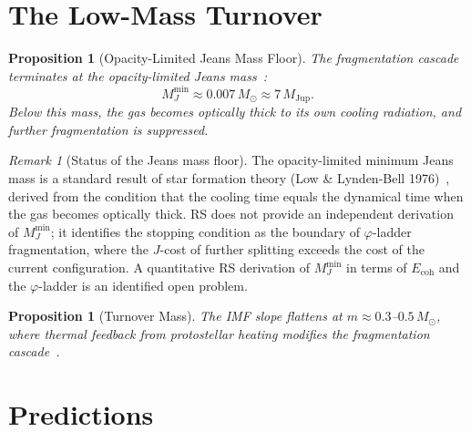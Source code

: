 \documentclass[12pt,a4paper]{article}
\newtheorem{proposition}[theorem]{Proposition}
\theoremstyle{definition}
\theoremstyle{remark}
\newtheorem{remark}[theorem]{Remark}
\begin{document}
\section{The Low-Mass Turnover}
\label{sec:turnover}

\begin{proposition}[Opacity-Limited Jeans Mass Floor]
\label{thm:jeans}
The fragmentation cascade terminates at the opacity-limited Jeans
mass~\cite{Low1976}:
\begin{equation}
  M_J^{\mathrm{min}} \approx 0.007\,M_\odot
  \approx 7\,M_{\mathrm{Jup}}.
\end{equation}
Below this mass, the gas becomes optically thick to its own cooling
radiation, and further fragmentation is suppressed.
\end{proposition}

\begin{remark}[Status of the Jeans mass floor]
The opacity-limited minimum Jeans mass is a standard result of
star formation theory (Low \& Lynden-Bell 1976)~\cite{Low1976},
derived from the condition that the cooling time equals the
dynamical time when the gas becomes optically thick.  RS does
not provide an independent derivation of $M_J^{\mathrm{min}}$;
it identifies the stopping condition as the boundary of
$\varphi$-ladder fragmentation, where the $J$-cost of further
splitting exceeds the cost of the current configuration.  A
quantitative RS derivation of $M_J^{\mathrm{min}}$ in terms of
$E_{\mathrm{coh}}$ and the $\varphi$-ladder is an identified
open problem.
\end{remark}

\begin{proposition}[Turnover Mass]
The IMF slope flattens at $m \approx 0.3$--$0.5\,M_\odot$, where
thermal feedback from protostellar heating modifies the
fragmentation cascade~\cite{Kroupa2001,Chabrier2003}.
\end{proposition}

\section{Predictions}
\label{sec:predictions}
\end{document}
